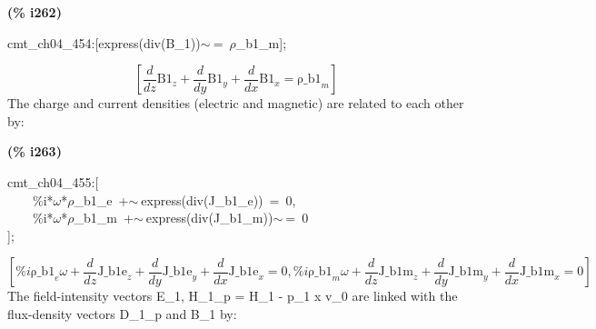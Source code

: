 \documentclass[fleqn]{article}
\begin{document}
\noindent
\begin{minipage}[t]{4.000000em}\color{red}\bfseries
(\% i262)	
\end{minipage}
\begin{minipage}[t]{\textwidth}\color{blue}
cmt\_ch04\_454:[express(div(B\_1))\ensuremath{\sim\ }=\ \ensuremath{\rho}\_b1\_m];
\end{minipage}
\[\displaystyle \tag{\% o262} 
\left[ \frac{d}{d z} {{\ensuremath{\mathrm{B1}}}_z}+\frac{d}{d y} {{\ensuremath{\mathrm{B1}}}_y}+\frac{d}{d x} {{\ensuremath{\mathrm{B1}}}_x}={{\ensuremath{\mathrm{\rho \_ b1}}}_m}\right] \mbox{}
\]
The charge and current densities (electric and magnetic) are related to each other by:


\noindent
\begin{minipage}[t]{4.000000em}\color{red}\bfseries
(\% i263)	
\end{minipage}
\begin{minipage}[t]{\textwidth}\color{blue}
cmt\_ch04\_455:[\\
\ \ \ \ \%i*\ensuremath{\omega}*\ensuremath{\rho}\_b1\_e\ +\ensuremath{\sim\ }express(div(J\_b1\_e))\ =\ 0,\ \\
\ \ \ \ \%i*\ensuremath{\omega}*\ensuremath{\rho}\_b1\_m\ +\ensuremath{\sim\ }express(div(J\_b1\_m))\ensuremath{\sim\ }=\ 0\\
];
\end{minipage}
\[\displaystyle \tag{\% o263} 
\operatorname{[}\% i {{\ensuremath{\mathrm{\rho \_ b1}}}_e} \omega +\frac{d}{d z} {{\ensuremath{\mathrm{J\_ b1e}}}_z}+\frac{d}{d y} {{\ensuremath{\mathrm{J\_ b1e}}}_y}+\frac{d}{d x} {{\ensuremath{\mathrm{J\_ b1e}}}_x}=0\operatorname{,}\% i {{\ensuremath{\mathrm{\rho \_ b1}}}_m} \omega +\frac{d}{d z} {{\ensuremath{\mathrm{J\_ b1m}}}_z}+\frac{d}{d y} {{\ensuremath{\mathrm{J\_ b1m}}}_y}+\frac{d}{d x} {{\ensuremath{\mathrm{J\_ b1m}}}_x}=
0\operatorname{]}\mbox{}
\]
The field-intensity vectors E\_1, H\_1\_p = H\_1 - p\_1 x v\_0 are linked with the flux-density vectors D\_1\_p and B\_1 by:
\end{document}
